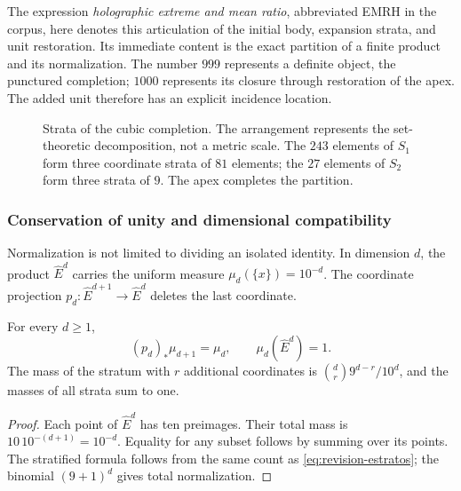 The expression \emph{holographic extreme and mean ratio}, abbreviated EMRH
in the corpus, here denotes this articulation of the initial body, expansion
strata, and unit restoration. Its immediate content is the exact partition
of a finite product and its normalization. The number \(999\) represents
a definite object, the punctured completion; \(1000\) represents its
closure through restoration of the apex. The added unit therefore has
an explicit incidence location.

\begin{figure}[htbp]
\centering
{}
\caption{Strata of the cubic completion. The arrangement represents
the set-theoretic decomposition, not a metric scale. The \(243\) elements
of \(S_1\) form three coordinate strata of \(81\) elements; the \(27\)
elements of \(S_2\) form three strata of \(9\). The apex completes the partition.}
\label{fig:revision-emrh}
\end{figure}



\subsubsection{Conservation of unity and dimensional compatibility}

Normalization is not limited to dividing an isolated identity. In dimension
\(d\), the product \(\widehat E^d\) carries the uniform measure
\(\mu_d(\{x\})=10^{-d}\). The coordinate projection
\(p_d:\widehat E^{d+1}\to\widehat E^d\) deletes the last coordinate.

\begin{proposition}
For every \(d\geq1\),
\[
 (p_d)_*\mu_{d+1}=\mu_d,
 \qquad \mu_d(\widehat E^d)=1.
\]
The mass of the stratum with \(r\) additional coordinates is
\(\binom dr9^{d-r}/10^d\), and the masses of all strata sum to one.
\end{proposition}
\begin{proof}
Each point of \(\widehat E^d\) has ten preimages. Their total mass is
\(10\,10^{-(d+1)}=10^{-d}\). Equality for any subset follows by
summing over its points. The stratified formula follows from the same
count as \eqref{eq:revision-estratos}; the binomial
\((9+1)^d\) gives total normalization.
\end{proof}

